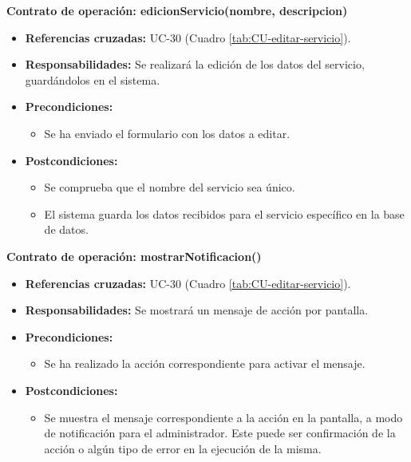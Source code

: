\textbf{Contrato de operación: edicionServicio(nombre, descripcion)}
\begin{itemize}
\item \textbf{Referencias cruzadas:} UC-30 (Cuadro \ref{tab:CU-editar-servicio}).
\item \textbf{Responsabilidades:} Se realizará la edición de los datos del servicio, guardándolos en el sistema.
\item \textbf{Precondiciones:} 
 \begin{itemize}
\item Se ha enviado el formulario con los datos a editar.
\end {itemize}
\item \textbf{Postcondiciones:} 
 \begin{itemize}
 \item Se comprueba que el nombre del servicio sea único.
\item El sistema guarda los datos recibidos para el servicio específico en la base de datos.
\end {itemize}
\end {itemize}

\textbf{Contrato de operación: mostrarNotificacion()}
\begin{itemize}
\item \textbf{Referencias cruzadas:} UC-30 (Cuadro \ref{tab:CU-editar-servicio}).
\item \textbf{Responsabilidades:} Se mostrará un mensaje de acción por pantalla.
\item \textbf{Precondiciones:} 
 \begin{itemize}
\item Se ha realizado la acción correspondiente para activar el mensaje.
\end {itemize}
\item \textbf{Postcondiciones:} 
 \begin{itemize}
\item Se muestra el mensaje correspondiente a la acción en la pantalla, a modo de notificación para el administrador. Este puede ser confirmación de la acción o algún tipo de error en la ejecución de la misma.
\end {itemize}
\end {itemize}


\vspace{10mm}

